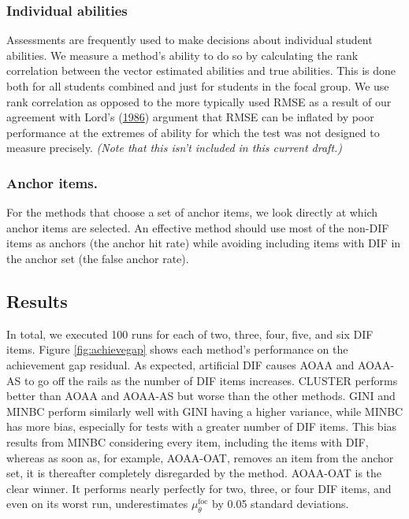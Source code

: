 \documentclass[
  11pt,
]{article}
\begin{document}
\hypertarget{individual-abilities}{%
\subsubsection{Individual abilities}\label{individual-abilities}}

Assessments are frequently used to make decisions about individual student abilities. We measure a method's ability to do so by calculating the rank correlation between the vector estimated abilities and true abilities. This is done both for all students combined and just for students in the focal group. We use rank correlation as opposed to the more typically used RMSE as a result of our agreement with Lord's (\protect\hyperlink{ref-lord1986maximum}{1986}) argument that RMSE can be inflated by poor performance at the extremes of ability for which the test was not designed to measure precisely. \emph{(Note that this isn't included in this current draft.)}

\hypertarget{anchor-items.}{%
\subsubsection{Anchor items.}\label{anchor-items.}}

For the methods that choose a set of anchor items, we look directly at which anchor items are selected. An effective method should use most of the non-DIF items as anchors (the anchor hit rate) while avoiding including items with DIF in the anchor set (the false anchor rate).

\hypertarget{results}{%
\subsection{Results}\label{results}}

In total, we executed 100 runs for each of two, three, four, five, and six DIF items. Figure \ref{fig:achievegap} shows each method's performance on the achievement gap residual. As expected, artificial DIF causes AOAA and AOAA-AS to go off the rails as the number of DIF items increases. CLUSTER performs better than AOAA and AOAA-AS but worse than the other methods. GINI and MINBC perform similarly well with GINI having a higher variance, while MINBC has more bias, especially for tests with a greater number of DIF items. This bias results from MINBC considering every item, including the items with DIF, whereas as soon as, for example, AOAA-OAT, removes an item from the anchor set, it is thereafter completely disregarded by the method. AOAA-OAT is the clear winner. It performs nearly perfectly for two, three, or four DIF items, and even on its worst run, underestimates \(\mu_\theta^\text{foc}\) by 0.05 standard deviations.
\end{document}

